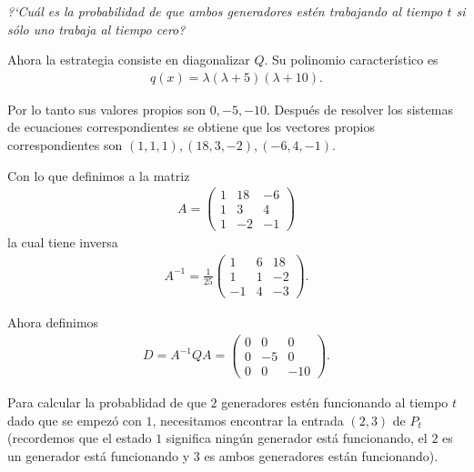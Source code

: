 \emph{
    ?`Cu\'al es la probabilidad de que ambos generadores est\'en trabajando al tiempo $t$ 
    si s\'olo uno trabaja al tiempo cero?\pn
}

\afterstatement\pn

Ahora la estrategia consiste en diagonalizar $Q$. 
Su polinomio característico es
\begin{align}
        q(x) =  \lambda (\lambda + 5) (\lambda + 10).
\end{align}\pn

Por lo tanto sus valores propios son $0, -5, -10$. Después de resolver los
sistemas de ecuaciones correspondientes se obtiene que los vectores propios correspondientes son
$(1,1,1), (18, 3, -2), (-6, 4, -1)$.

Con lo que definimos a la matriz
\begin{align}
     A      =
            \begin{pmatrix}
                1   &   18  &   -6      \\
                1   &   3   &   4       \\
                1   &   -2  &   -1
            \end{pmatrix}   
\end{align}
la cual tiene inversa
\begin{align}
     A^{-1}     =   \frac{1}{25}
                \begin{pmatrix}
                    1       &   6   &   18      \\
                    1       &   1   &   -2      \\
                    -1      &   4   &   -3
                \end{pmatrix}.   
\end{align}\pn

Ahora definimos
\begin{align}
    D = A^{-1} Q A  =
                    \begin{pmatrix}
                        0   &   0   &   0      \\
                        0   &   -5  &   0      \\
                        0   &   0   &   -10
                    \end{pmatrix}.
\end{align}

Para calcular la probablidad de que $2$ generadores estén funcionando al tiempo $t$ dado que se empezó con $1$, necesitamos 
encontrar la entrada $(2,3)$ de $P_t$ (recordemos que el estado $1$ significa ningún generador está funcionando, el $2$ es un 
generador está funcionando y $3$ es ambos generadores están funcionando).\pn
  

